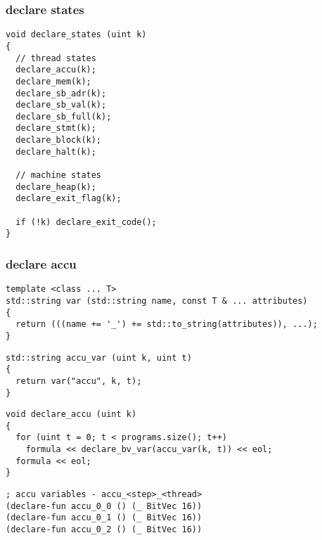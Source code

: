 \subsubsection{declare states}

\begin{lstlisting}[style=c++]
void declare_states (uint k)
{
  // thread states
  declare_accu(k);
  declare_mem(k);
  declare_sb_adr(k);
  declare_sb_val(k);
  declare_sb_full(k);
  declare_stmt(k);
  declare_block(k);
  declare_halt(k);

  // machine states
  declare_heap(k);
  declare_exit_flag(k);

  if (!k) declare_exit_code();
}
\end{lstlisting}

\subsubsection{declare accu}

%

\begin{lstlisting}[style=c++]
template <class ... T>
std::string var (std::string name, const T & ... attributes)
{
  return (((name += '_') += std::to_string(attributes)), ...);
}
\end{lstlisting}

\begin{lstlisting}[style=c++]
std::string accu_var (uint k, uint t)
{
  return var("accu", k, t);
}
\end{lstlisting}

\begin{lstlisting}[style=c++]
void declare_accu (uint k)
{
  for (uint t = 0; t < programs.size(); t++)
    formula << declare_bv_var(accu_var(k, t)) << eol;
  formula << eol;
}
\end{lstlisting}

% 
\begin{lstlisting}[language=SMTLib]
; accu variables - accu_<step>_<thread>
(declare-fun accu_0_0 () (_ BitVec 16))
(declare-fun accu_0_1 () (_ BitVec 16))
(declare-fun accu_0_2 () (_ BitVec 16))
\end{lstlisting}

